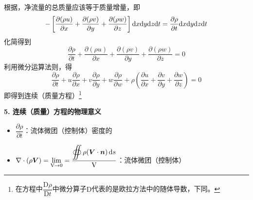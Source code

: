  根据\blue[质量守恒定律]，净流量的总质量应该等于质量增量，即
 \begin{equation}
 	- \left[\dfrac{\partial (\rho u)}{\partial x} +  \dfrac{\partial (\rho v)}{\partial y} +  \dfrac{\partial (\rho w)}{\partial z} \right] {\rm{d}} x {\rm{d}} y {\rm{d}} z {\rm{d}} t = \dfrac{\partial \rho}{\partial t} {\rm{d}} x {\rm{d}} y {\rm{d}} z{\rm{d}} t
 \end{equation}
化简得到
\begin{equation}
	\dfrac{\partial \rho}{\partial t} + \dfrac{\partial (\rho u)}{\partial x} +  \dfrac{\partial (\rho v)}{\partial y} +  \dfrac{\partial (\rho w)}{\partial z}  = 0
\end{equation}
利用微分运算法则，得
\begin{equation}
	\dfrac{\partial \rho}{\partial t} + u \dfrac{\partial \rho }{\partial x} +  v \dfrac{\partial \rho }{\partial y} +  w \dfrac{\partial \rho }{\partial w} + \rho \left(\dfrac{\partial u}{\partial x} + \dfrac{\partial v}{\partial y}  + \dfrac{\partial w}{\partial z} \right) = 0
\end{equation}
即得到连续（质量方程）\footnote{在方程中$\dfrac{\text{D} \rho}{\text{D} t}$中微分算子$\text{D}$代表的是欧拉方法中的随体导数，下同。}


\noindent \textbf{5. 连续（质量）方程的物理意义}
\begin{itemize}
	\item $\dfrac{\partial \rho}{\partial t}$：流体微团（控制体）密度的\red[局部增长率]
	\item $\displaystyle \nabla \cdot (\rho \bm{V}) = \lim\limits_{\text{V} \to 0} = \dfrac{ \displaystyle \oiint \rho (\bm{V} \cdot \bm{n})\, {\rm{d}} s}{\text{V}}$：流体微团（控制体）\blue[单位体积流出的质量流量]
\end{itemize}
\vspace*{1em}

